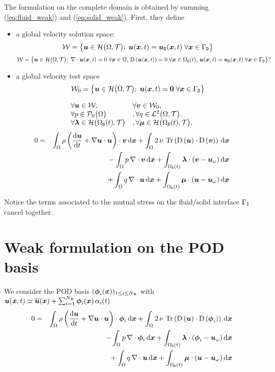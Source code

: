 \documentclass[10pt,a4paper]{article}
\begin{document}
The formulation on the complete domain is obtained by summing (\ref{eq:fluid_weak}) and (\ref{eq:solid_weak}). First, they define
\begin{itemize}
\item a global velocity solution space: 
$$\sW = \left\{\vu \in \sH\big(\dom, \sT\big);\;\vu(\vx, t) = \vud(\vx, t)\; \forall \vx \in \boud \right\}$$
$$\sW = \left\{\vu \in \sH\big(\dom, \sT\big);\;\div \vu(\vx, t)=0\; \forall \vx \in \dom,\,\D{\vu(\vx, t)}=0\; \forall \vx \in \doms(t),\,\vu(\vx, t) = \vud(\vx, t)\; \forall \vx \in \boud \right\}?$$
\item a global velocity test space 
$$\sW_0 = \left\{\vu \in \sH\big(\dom, \sT\big);\;\vu(\vx, t) = \vec 0 \; \forall \vx \in \boud \right\}$$
\end{itemize}
$$
\begin{array}{ll}
\forall \vu \in \sW, & \forall \vv \in \sW_0, \\
\forall p \in \sP_0\big(\dom\big) &,  \forall q \in \sL^2\big(\dom, \sT\big), \\
\forall \vlambda \in \sH\big(\doms(t),\sT\big)&,  \forall \vmu \in \sH\big(\doms(t),\sT\big), \\
\end{array}
$$
\begin{eqnarray}
\nonumber 0 &=& 
\int_{\dom}\rho\left(\dt \vu + \grad \vu \cdot \vu\right)\cdot\vv \,\d\vx + \int_{\dom}2\,\nu\,\trace{\D{\vu}\cdot\D{\vv}} \, \d\vx\\
\nonumber & & - \int_{\dom} p\,\div \vv \,\d\vx + \int_{\doms(t)} \vlambda \cdot (\vv-\vuo) \, \d \vx \\
\label{eq:solid_weak} & & + \int_{\dom} q\,\div \vu \,\d\vx + \int_{\doms(t)}\vmu \cdot (\vu-\vuo)\,\d \vx
\end{eqnarray}
%

Notice the terms associated to the mutual stress on the fluid/solid interface $\boui$ cancel together.
%

\section{Weak formulation on the POD basis}
We consider the POD basis $(\vphi_i(\vx))_{1 \leq i \leq N_\Phi}$ with $\vu(\vx, t)\simeq \bu(\vx) + \sum_{i=1}^{N_\Phi}\vphi_i(\vx)\,\alpha_i(t)$
\begin{eqnarray}
\nonumber 0 &=& 
\int_{\dom}\rho\left(\dt \vu + \grad \vu \cdot \vu\right)\cdot\vphi_i \,\d\vx + \int_{\dom}2\,\nu\,\trace{\D{\vu}\cdot\D{\vphi_i}} \, \d\vx\\
\nonumber & & - \int_{\dom} p\,\div \vphi_i \,\d\vx + \int_{\doms(t)} \vlambda \cdot (\vphi_i-\vuo) \, \d \vx \\
\label{eq:solid_weak} & & + \int_{\dom} q\,\div \vu \,\d\vx + \int_{\doms(t)}\vmu \cdot (\vu-\vuo)\,\d \vx
\end{eqnarray}
\end{document}
